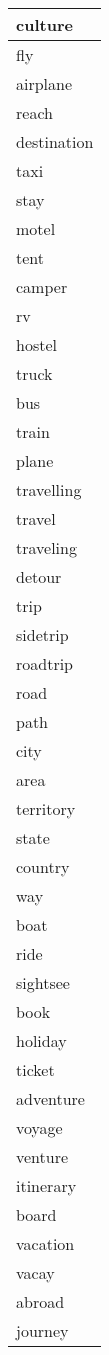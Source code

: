 \begin{longtable}{|p{3cm}|}
culture \\ \hline
fly \\ \hline
airplane \\ \hline
reach \\ \hline
destination \\ \hline
taxi \\ \hline
stay \\ \hline
motel \\ \hline
tent \\ \hline
camper \\ \hline
rv \\ \hline
hostel \\ \hline
truck \\ \hline
bus \\ \hline
train \\ \hline
plane \\ \hline
travelling \\ \hline
travel \\ \hline
traveling \\ \hline
detour \\ \hline
trip \\ \hline
sidetrip \\ \hline
roadtrip \\ \hline
road \\ \hline
path \\ \hline
city \\ \hline
area \\ \hline
territory \\ \hline
state \\ \hline
country \\ \hline
way \\ \hline
boat \\ \hline
ride \\ \hline
sightsee \\ \hline
book \\ \hline
holiday \\ \hline
ticket \\ \hline
adventure \\ \hline
voyage \\ \hline
venture \\ \hline
itinerary \\ \hline
board \\ \hline
vacation \\ \hline
vacay \\ \hline
abroad \\ \hline
journey \\ \hline

\end{longtable}

